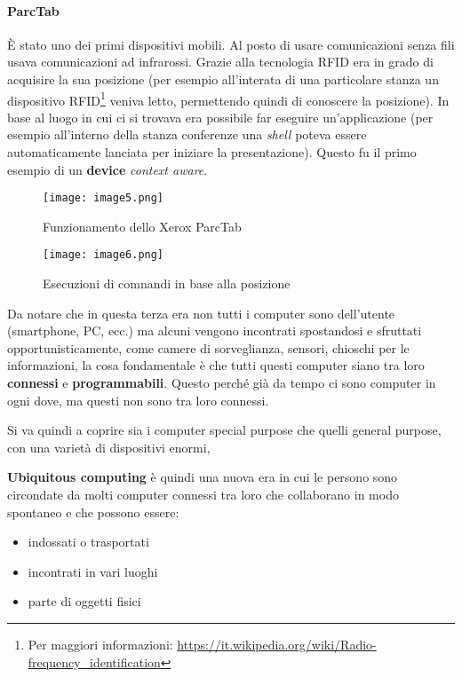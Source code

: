 \paragraph*{ParcTab} \`E stato uno dei primi dispositivi mobili. Al posto di
usare comunicazioni senza fili usava comunicazioni ad infrarossi. Grazie alla
tecnologia RFID era in grado di acquisire la sua posizione (per esempio
all'interata di una particolare stanza un dispositivo RFID\footnote{Per
maggiori informazioni:
\url{https://it.wikipedia.org/wiki/Radio-frequency_identification}} veniva
letto, permettendo quindi di conoscere la posizione). In base al luogo in cui ci
si trovava era possibile far eseguire un'applicazione (per esempio all'interno
della stanza conferenze una \textit{shell} poteva essere automaticamente
lanciata per iniziare la presentazione). Questo fu il primo esempio di un
\textbf{device} \textit{context aware}.

\begin{figure}[H]
  \texttt{[image: image5.png]}
  \caption{Funzionamento dello Xerox ParcTab}
\endminipage \hspace{75pt}
  \texttt{[image: image6.png]}
  \caption{Esecuzioni di comnandi in base alla posizione}
\endminipage
\end{figure}

Da notare che in questa terza era non tutti i computer sono dell'utente
(smartphone, PC, ecc.) ma alcuni vengono incontrati spostandosi e
sfruttati opportunisticamente, come camere di sorveglianza, sensori,
chioschi per le informazioni, la cosa fondamentale è che tutti questi
computer siano tra loro \textbf{connessi} e \textbf{programmabili}.
Questo perché già da tempo ci sono computer in ogni dove, ma questi non
sono tra loro connessi.

Si va quindi a coprire sia i computer special purpose che quelli general
purpose, con una varietà di dispositivi enormi,

\textbf{Ubiquitous computing} è quindi una nuova era in cui le persono
sono circondate da molti computer connessi tra loro che collaborano in
modo spontaneo e che possono essere:

\begin{itemize}
\item indossati o trasportati
\item incontrati in vari luoghi
\item parte di oggetti fisici

\end{itemize}

